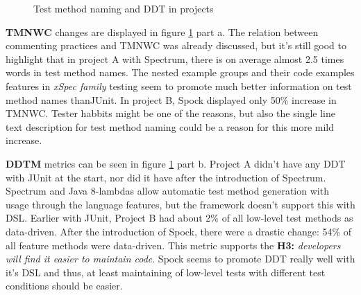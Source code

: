     \begin{figure}[H]%
        \centering
        \qquad
        \caption{Test method naming and DDT in projects}%
        \label{fig:tmnwc-ddtm}%
    \end{figure}

\textbf{TMNWC} changes are displayed in figure \ref{fig:tmnwc-ddtm} part a. The relation between commenting practices
and TMNWC was already discussed, but it's still good to highlight that in project A with Spectrum, there is on average
almost 2.5 times words in test method names. The nested example groups and their code examples features in \textit{xSpec family} testing
seem to promote much better information on test method names than\restoregeometry \noindent  JUnit. In project B, Spock displayed only 50\% increase in TMNWC.
Tester habbits might be one of the reasons, but also the single line text description for test method naming could be a
reason for this more mild increase.

\textbf{DDTM} metrics can be seen in figure \ref{fig:tmnwc-ddtm} part b. Project A didn't have any DDT with JUnit at the start,
nor did it have after the introduction of Spectrum. Spectrum and Java 8-lambdas allow automatic test method generation with
usage through the language features, but the framework doesn't support this with DSL. Earlier with JUnit, Project B had about 2\% of
all low-level test methods as data-driven. After the introduction of Spock, there were a drastic change:
 54\% of all
feature methods were data-driven. This metric supports the \textbf{H3:} \textit{developers will find it easier to maintain code}.
Spock seems to promote DDT really well with it's DSL and thus, at least maintaining of low-level tests with different
test conditions should be easier.

